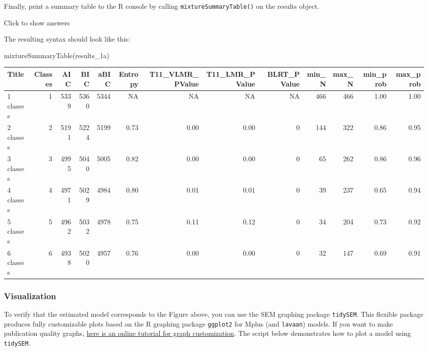 \documentclass[
]{book}
\newenvironment{Shaded}{\begin{snugshade}}{\end{snugshade}}
\newcommand{\FunctionTok}[1]{\textcolor[rgb]{0.00,0.00,0.00}{#1}}
\newcommand{\NormalTok}[1]{#1}
\begin{document}
Finally, print a summary table to the R console by calling \texttt{mixtureSummaryTable()} on the results object.

Click to show answers

The resulting syntax should look like this:

\begin{Shaded}
\begin{Highlighting}[]
\FunctionTok{mixtureSummaryTable}\NormalTok{(results\_1a)}
\end{Highlighting}
\end{Shaded}

\begin{tabular}[t]{l|r|r|r|r|r|r|r|r|r|r|r|r}
\hline
Title & Classes & AIC & BIC & aBIC & Entropy & T11\_VLMR\_PValue & T11\_LMR\_PValue & BLRT\_PValue & min\_N & max\_N & min\_prob & max\_prob\\
\hline
1 classes & 1 & 5339 & 5360 & 5344 & NA & NA & NA & NA & 466 & 466 & 1.00 & 1.00\\
\hline
2 classes & 2 & 5191 & 5224 & 5199 & 0.73 & 0.00 & 0.00 & 0 & 144 & 322 & 0.86 & 0.95\\
\hline
3 classes & 3 & 4995 & 5040 & 5005 & 0.82 & 0.00 & 0.00 & 0 & 65 & 262 & 0.86 & 0.96\\
\hline
4 classes & 4 & 4971 & 5029 & 4984 & 0.80 & 0.01 & 0.01 & 0 & 39 & 237 & 0.65 & 0.94\\
\hline
5 classes & 5 & 4962 & 5032 & 4978 & 0.75 & 0.11 & 0.12 & 0 & 34 & 204 & 0.73 & 0.92\\
\hline
6 classes & 6 & 4938 & 5020 & 4957 & 0.76 & 0.00 & 0.00 & 0 & 32 & 147 & 0.69 & 0.91\\
\hline
\end{tabular}

\hypertarget{visualization-1}{%
\subsubsection{Visualization}\label{visualization-1}}

To verify that the estimated model corresponds to the Figure above, you can use the SEM graphing package \texttt{tidySEM}.
This flexible package produces fully customizable plots based on the R graphing package \texttt{ggplot2} for Mplus (and \texttt{lavaan}) models.
If you want to make publication quality graphs, \href{https://cjvanlissa.github.io/tidySEM/articles/Plotting_graphs.html}{here is an online tutorial for graph customization}.
The script below demonstrates how to plot a model using \texttt{tidySEM}.
\end{document}
